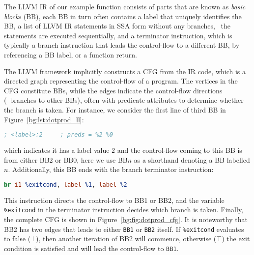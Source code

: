 The LLVM IR of our example function consists of parts that are known as
\emph{basic blocks} (BB), each BB in turn often contains a label that
uniquely identifies the BB, a list of LLVM IR statements in SSA form
without any branches, \ie~the statements are executed sequentially, and a
terminator instruction, which is typically a branch instruction that leads
the control-flow to a different BB, by referencing a BB label, or a function
return.

The LLVM framework implicitly constructs a CFG from the IR code, which is a
directed graph representing the control-flow of a program.  The vertices in
the CFG constitute BBs, while the edges indicate the control-flow directions
(\ie~branches to other BBs), often with predicate attributes to determine
whether the branch is taken.  For instance, we consider the first line of third
BB in Figure~\ref{bg:lst:dotprod_ll}:
\begin{lstlisting}[language=LLVM, basicstyle=\tt]
    ; <label>:2     ; preds = %2 %0
\end{lstlisting}\vspace{-16.5pt}
which indicates it has a label value $2$ and the control-flow coming to this
BB is from either BB2 or BB0, here we use BB$n$ as a shorthand denoting a
BB labelled $n$.  Additionally, this BB ends with the branch terminator
instruction:
\begin{lstlisting}[language=LLVM, basicstyle=\tt]
    br i1 %exitcond, label %1, label %2
\end{lstlisting}\vspace{-16.5pt}
This instruction directs the control-flow to BB1 or BB2, and the variable
\verb|%exitcond| in the terminator instruction decides which branch is taken.
Finally, the complete CFG is shown in Figure~\ref{bg:fig:dotprod_cfg}.  It
is noteworthy that BB2 has two edges that leads to either \verb|BB1| or
\verb|BB2| itself.  If \verb|%exitcond| evaluates to false ($\bot$), then
another iteration of BB2 will commence, otherwise ($\top$) the exit condition
is satisfied and will lead the control-flow to \verb|BB1|.
